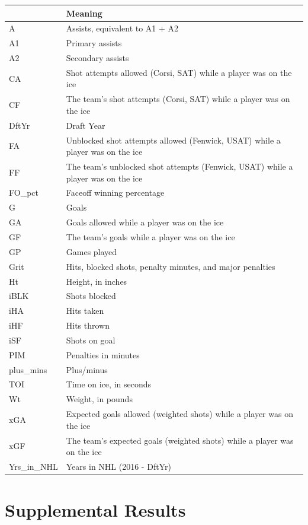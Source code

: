 \documentclass[10pt]{article}
\begin{document}
{{{{\begin{table}[H]
\centering
\label{data-dictionary}
\begin{tabular}[t]{p{} p{} }
\toprule
 & Meaning\\
\midrule
A & Assists, equivalent to A1 + A2\\
A1 & Primary assists\\
A2 & Secondary assists\\
CA & Shot attempts allowed (Corsi, SAT) while a player was on the ice\\
CF & The team's shot attempts (Corsi, SAT) while a player was on the ice\\
DftYr & Draft Year\\
FA & Unblocked shot attempts allowed (Fenwick, USAT) while a player was on the ice\\
FF & The team's unblocked shot attempts (Fenwick, USAT) while a player was on the ice\\
FO\_pct & Faceoff winning percentage \\
G & Goals\\
GA & Goals allowed while a player was on the ice\\
GF & The team's goals while a player was on the ice\\
GP & Games played\\
Grit & Hits, blocked shots, penalty minutes, and major penalties\\
Ht & Height, in inches\\
iBLK & Shots blocked\\
iHA & Hits taken\\
iHF & Hits thrown\\
iSF & Shots on goal\\
PIM & Penalties in minutes\\
plus\_mins & Plus/minus\\
TOI & Time on ice, in seconds\\
Wt & Weight, in pounds\\
xGA & Expected goals allowed (weighted shots) while a player was on the ice\\
xGF & The team's expected goals (weighted shots) while a player was on the ice\\
Yrs\_in\_NHL & Years in NHL (2016 - DftYr) \\
\bottomrule
\end{tabular}
\end{table}

\vfill\eject
\section{Supplemental Results}
\label{a:supplemental}

}}}}
\end{document}
